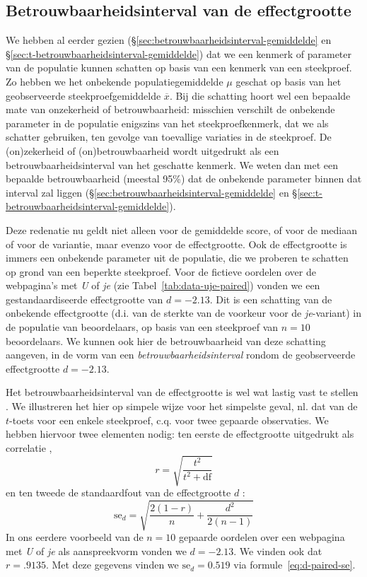 \documentclass[
]{book}
\begin{document}
\hypertarget{betrouwbaarheidsinterval-van-de-effectgrootte}{%
\subsection{Betrouwbaarheidsinterval van de effectgrootte}\label{betrouwbaarheidsinterval-van-de-effectgrootte}}

We hebben al eerder gezien
(§\ref{sec:betrouwbaarheidsinterval-gemiddelde} en §\ref{sec:t-betrouwbaarheidsinterval-gemiddelde})
dat we een kenmerk
of parameter van de populatie kunnen schatten op basis van een kenmerk
van een steekproef. Zo hebben we het onbekende populatiegemiddelde \(\mu\)
geschat op basis van het geobserveerde steekproefgemiddelde
\(\overline{x}\). Bij die schatting hoort wel een bepaalde mate van
onzekerheid of betrouwbaarheid: misschien verschilt de onbekende
parameter in de populatie enigszins van het steekproefkenmerk, dat we
als schatter gebruiken, ten gevolge van toevallige variaties in de
steekproef. De (on)zekerheid of (on)betrouwbaarheid wordt uitgedrukt als
een betrouwbaarheidsinterval van het geschatte kenmerk. We weten dan met
een bepaalde betrouwbaarheid (meestal 95\%) dat de onbekende parameter
binnen dat interval zal liggen
(§\ref{sec:betrouwbaarheidsinterval-gemiddelde} en §\ref{sec:t-betrouwbaarheidsinterval-gemiddelde}).

Deze redenatie nu geldt niet alleen voor de gemiddelde score, of voor de
mediaan of voor de variantie, maar evenzo voor de effectgrootte. Ook de
effectgrootte is immers een onbekende parameter uit de populatie, die we
proberen te schatten op grond van een beperkte steekproef. Voor de
fictieve oordelen over de webpagina's met \emph{U} of \emph{je} (zie
Tabel~\ref{tab:data-uje-paired}) vonden we een gestandaardiseerde
effectgrootte van \(d=-2.13\). Dit is een schatting van de onbekende
effectgrootte (d.i. van de sterkte van de voorkeur voor de \emph{je}-variant)
in de populatie van beoordelaars, op basis van een steekproef van \(n=10\)
beoordelaars. We kunnen ook hier de betrouwbaarheid van deze schatting
aangeven, in de vorm van een \emph{betrouwbaarheidsinterval} rondom de
geobserveerde effectgrootte \(d=-2.13\).

Het betrouwbaarheidsinterval van de effectgrootte is wel wat lastig vast
te stellen \citep{Naka07, Chen15}. We illustreren het hier op simpele wijze
voor het simpelste geval, nl. dat van de \(t\)-toets voor een enkele steekproef,
c.q. voor twee gepaarde observaties. We hebben hiervoor twee elementen
nodig: ten eerste de effectgrootte uitgedrukt als correlatie \citep[ p.359, formule 12.1]{Rose08}, \[r = \sqrt{ \frac{t^2}{t^2+\textrm{df}} }\] en
ten tweede de standaardfout van de effectgrootte \(d\) \citep[ p.600,
formule 18]{Naka07}:
\begin{equation}
  \label{eq:d-paired-se}
    \textrm{se}_d = \sqrt{ \frac{2(1-r)}{n} + \frac{d^2}{2(n-1)} }
\end{equation}
In
ons eerdere voorbeeld van de \(n=10\) gepaarde oordelen over een webpagina
met \emph{U} of \emph{je} als aanspreekvorm vonden we \(d=-2.13\). We vinden ook dat
\(r=.9135\). Met deze gegevens vinden we \(\textrm{se}_d = 0.519\) via
formule~\eqref{eq:d-paired-se}.
\end{document}
